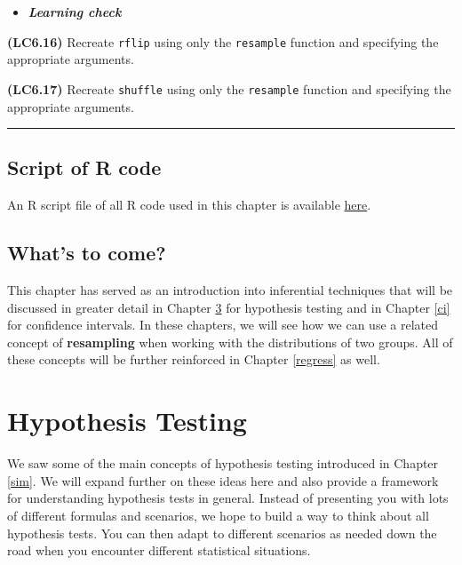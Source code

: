 \documentclass[]{tufte-book}
\let\oldrule=\rule
\renewcommand{\rule}[1]{\oldrule{\linewidth}}
\newenvironment{rmdblock}[1]
  {\begin{shaded*}
  \begin{itemize}
  \renewcommand{\labelitemi}{
    \raisebox{-.7\height}[0pt][0pt]{
    }
  }
  \item
  }
  {
  \end{itemize}
  \end{shaded*}
  }
\newenvironment{learncheck}
  {\begin{rmdblock}{warning}}
  {\end{rmdblock}}
\begin{document}
\begin{learncheck}
\textbf{\emph{Learning check}}
\end{learncheck}

\textbf{(LC6.16)} Recreate \texttt{rflip} using only the
\texttt{resample} function and specifying the appropriate arguments.

\textbf{(LC6.17)} Recreate \texttt{shuffle} using only the
\texttt{resample} function and specifying the appropriate arguments.

\begin{center}\rule{0.5\linewidth}{\linethickness}\end{center}

\section{Script of R code}\label{script-of-r-code-2}

An R script file of all R code used in this chapter is available
\href{http://ismayc.github.io/moderndiver-book/06-sim.R}{here}.

\section{What's to come?}\label{whats-to-come-3}

This chapter has served as an introduction into inferential techniques
that will be discussed in greater detail in Chapter \ref{hypo} for
hypothesis testing and in Chapter \ref{ci} for confidence intervals. In
these chapters, we will see how we can use a related concept of
\textbf{resampling} when working with the distributions of two groups.
All of these concepts will be further reinforced in Chapter
\ref{regress} as well.

\chapter{Hypothesis Testing}\label{hypo}

We saw some of the main concepts of hypothesis testing introduced in
Chapter \ref{sim}. We will expand further on these ideas here and also
provide a framework for understanding hypothesis tests in general.
Instead of presenting you with lots of different formulas and scenarios,
we hope to build a way to think about all hypothesis tests. You can then
adapt to different scenarios as needed down the road when you encounter
different statistical situations.
\end{document}
